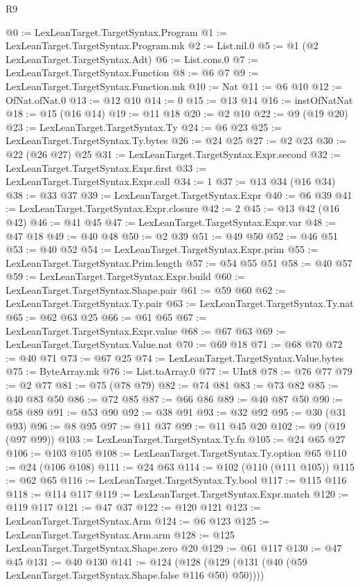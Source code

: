\begin{lexlean}{R9}
\begin{coremodule}
@0 := LexLeanTarget.TargetSyntax.Program
@1 := LexLeanTarget.TargetSyntax.Program.mk
@2 := List.nil.{0}
@5 := @1 (@2 LexLeanTarget.TargetSyntax.Adt)
@6 := List.cons.{0}
@7 := LexLeanTarget.TargetSyntax.Function
@8 := @6 @7
@9 := LexLeanTarget.TargetSyntax.Function.mk
@10 := Nat
@11 := @6 @10
@12 := OfNat.ofNat.{0}
@13 := @12 @10
@14 := 0
@15 := @13 @14
@16 := instOfNatNat
@18 := @15 (@16 @14)
@19 := @11 @18
@20 := @2 @10
@22 := @9 (@19 @20)
@23 := LexLeanTarget.TargetSyntax.Ty
@24 := @6 @23
@25 := LexLeanTarget.TargetSyntax.Ty.bytes
@26 := @24 @25
@27 := @2 @23
@30 := @22 (@26 @27) @25
@31 := LexLeanTarget.TargetSyntax.Expr.second
@32 := LexLeanTarget.TargetSyntax.Expr.first
@33 := LexLeanTarget.TargetSyntax.Expr.call
@34 := 1
@37 := @13 @34 (@16 @34)
@38 := @33 @37
@39 := LexLeanTarget.TargetSyntax.Expr
@40 := @6 @39
@41 := LexLeanTarget.TargetSyntax.Expr.closure
@42 := 2
@45 := @13 @42 (@16 @42)
@46 := @41 @45
@47 := LexLeanTarget.TargetSyntax.Expr.var
@48 := @47 @18
@49 := @40 @48
@50 := @2 @39
@51 := @49 @50
@52 := @46 @51
@53 := @40 @52
@54 := LexLeanTarget.TargetSyntax.Expr.prim
@55 := LexLeanTarget.TargetSyntax.Prim.length
@57 := @54 @55 @51
@58 := @40 @57
@59 := LexLeanTarget.TargetSyntax.Expr.build
@60 := LexLeanTarget.TargetSyntax.Shape.pair
@61 := @59 @60
@62 := LexLeanTarget.TargetSyntax.Ty.pair
@63 := LexLeanTarget.TargetSyntax.Ty.nat
@65 := @62 @63 @25
@66 := @61 @65
@67 := LexLeanTarget.TargetSyntax.Expr.value
@68 := @67 @63
@69 := LexLeanTarget.TargetSyntax.Value.nat
@70 := @69 @18
@71 := @68 @70
@72 := @40 @71
@73 := @67 @25
@74 := LexLeanTarget.TargetSyntax.Value.bytes
@75 := ByteArray.mk
@76 := List.toArray.{0}
@77 := UInt8
@78 := @76 @77
@79 := @2 @77
@81 := @75 (@78 @79)
@82 := @74 @81
@83 := @73 @82
@85 := @40 @83 @50
@86 := @72 @85
@87 := @66 @86
@89 := @40 @87 @50
@90 := @58 @89
@91 := @53 @90
@92 := @38 @91
@93 := @32 @92
@95 := @30 (@31 @93)
@96 := @8 @95
@97 := @11 @37
@99 := @11 @45 @20
@102 := @9 (@19 (@97 @99))
@103 := LexLeanTarget.TargetSyntax.Ty.fn
@105 := @24 @65 @27
@106 := @103 @105
@108 := LexLeanTarget.TargetSyntax.Ty.option @65
@110 := @24 (@106 @108)
@111 := @24 @63
@114 := @102 (@110 (@111 @105))
@115 := @62 @65
@116 := LexLeanTarget.TargetSyntax.Ty.bool
@117 := @115 @116
@118 := @114 @117
@119 := LexLeanTarget.TargetSyntax.Expr.match
@120 := @119 @117
@121 := @47 @37
@122 := @120 @121
@123 := LexLeanTarget.TargetSyntax.Arm
@124 := @6 @123
@125 := LexLeanTarget.TargetSyntax.Arm.arm
@128 := @125 LexLeanTarget.TargetSyntax.Shape.zero @20
@129 := @61 @117
@130 := @47 @45
@131 := @40 @130
@141 := @124 (@128 (@129 (@131 (@40 (@59 LexLeanTarget.TargetSyntax.Shape.false @116 @50) @50))))

\end{coremodule}
\end{lexlean}
